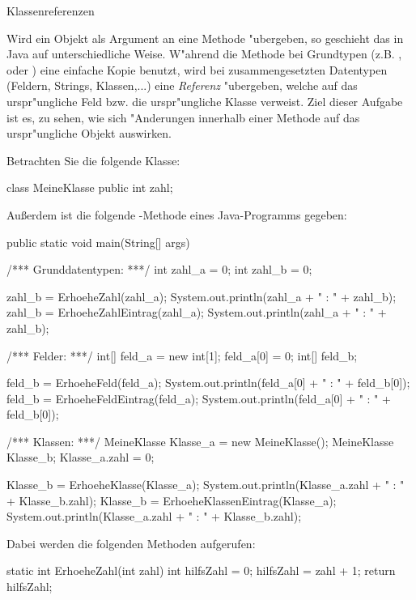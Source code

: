 \begin{exercise}{Klassenreferenzen}
\begin{body}
\noindent
Wird ein Objekt als Argument an eine Methode "ubergeben, so geschieht das in Java auf unterschiedliche Weise. W"ahrend die Methode
bei Grundtypen (z.B. ,  oder ) eine einfache Kopie benutzt, wird bei zusammengesetzten Datentypen
(Feldern, Strings, Klassen,...) eine \emph{Referenz} "ubergeben, welche auf das urspr"ungliche Feld bzw. die urspr"ungliche Klasse verweist.
Ziel dieser Aufgabe ist es, zu sehen, wie sich "Anderungen innerhalb einer Methode auf das urspr"ungliche Objekt auswirken.

\noindent
Betrachten Sie die folgende Klasse:
\medskip

\begin{displaycode}
class MeineKlasse {
  public int zahl;
} 
\end{displaycode}
\medskip

\noindent
Au\ss erdem ist die folgende -Methode eines Java-Programms gegeben:
\begin{displaycode}
public static void main(String[] args) {
  /*** Grunddatentypen: ***/ 
  int zahl_a = 0;
  int zahl_b = 0;
  
  zahl_b = ErhoeheZahl(zahl_a);
  System.out.println(zahl_a + " : " + zahl_b);
  zahl_b = ErhoeheZahlEintrag(zahl_a);
  System.out.println(zahl_a + " : " + zahl_b);
  
  /*** Felder: ***/
  int[] feld_a = new int[1];
  feld_a[0] = 0;
  int[] feld_b;
  
  feld_b = ErhoeheFeld(feld_a);
  System.out.println(feld_a[0] + " : " + feld_b[0]);	
  feld_b = ErhoeheFeldEintrag(feld_a);
  System.out.println(feld_a[0] + " : " + feld_b[0]);	
  
  /*** Klassen: ***/
  MeineKlasse Klasse_a = new MeineKlasse();
  MeineKlasse Klasse_b;
  Klasse_a.zahl = 0;
  
  Klasse_b = ErhoeheKlasse(Klasse_a);
  System.out.println(Klasse_a.zahl + " : " + Klasse_b.zahl);
  Klasse_b = ErhoeheKlassenEintrag(Klasse_a);
  System.out.println(Klasse_a.zahl + " : " + Klasse_b.zahl);
}
\end{displaycode}
\newpage

\noindent
Dabei werden die folgenden Methoden aufgerufen:
\begin{displaycode}
static int ErhoeheZahl(int zahl) {
  int hilfsZahl = 0;
  hilfsZahl = zahl + 1;
  return hilfsZahl;
}
  

\end{displaycode}
\end{body}
\end{exercise}
